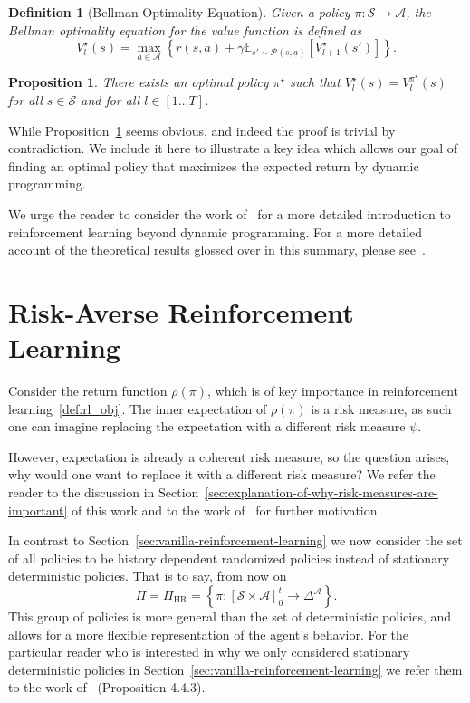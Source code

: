 \documentclass[10pt]{article}
\newtheorem{definition}{Definition}
\renewcommand{\cite}{\citep}
\theoremstyle{plain}
\newtheorem{proposition}{Proposition}
\theoremstyle{remark}
\begin{document}
\begin{definition}[Bellman Optimality Equation]\label{def:bellman_optimality}
        Given a policy $\pi : \mathcal{S} \to \mathcal{A}$, the Bellman optimality equation for the value function is defined as
        \[
                V^\star_l(s) = \max_{a \in \mathcal{A}} \left\{ r(s, a) + \gamma \mathbb{E}_{s' \sim \mathcal{P}(s, a)} [V^\star_{l+1}(s')] \right\}.
        \]
\end{definition}

\begin{proposition}\label{prop:optimal_policy_value}
        There exists an optimal policy $\pi^\star$ such that $V^\star_l(s) = V^{\pi^\star}_l(s)$ for all $s \in \mathcal{S}$ and for all $l \in [1\ldots T]$.
\end{proposition}

While Proposition~\ref{prop:optimal_policy_value} seems obvious, and indeed the proof is trivial by contradiction. We include it here to illustrate a key idea which allows our goal of finding an optimal policy that maximizes the expected return by dynamic programming.

We urge the reader to consider the work of~\cite{sutton2018} for a more detailed introduction to reinforcement learning beyond dynamic programming.
For a more detailed account of the theoretical results glossed over in this summary, please see~\cite{Puterman1994}.

\section{Risk-Averse Reinforcement Learning}

Consider the return function $\rho(\pi)$, which is of key importance in reinforcement learning~\ref{def:rl_obj}. 
The inner expectation of $\rho(\pi)$ is a risk measure, as such one can imagine replacing the expectation
with a different risk measure $\psi$.

However, expectation is already a coherent risk measure, so the question arises, why would one want to replace it with a different risk measure? 
We refer the reader to the discussion in Section~\ref{sec:explanation-of-why-risk-measures-are-important} of this
work and to the work of~\cite{Bauerle2011, follmer2016, howard1972} for further motivation. 

In contrast to Section~\ref{sec:vanilla-reinforcement-learning} we now consider the set of all policies to be history dependent randomized policies instead of stationary deterministic policies. That is to say, from now on 
\[ 
        \Pi = \Pi_{\text{HR}} = \left\{ \pi : {[\mathcal{S} \times \mathcal{A}]}_{0}^{t} \to \Delta^\mathcal{A} \right\}.
\]
This group of policies is more general than the set of deterministic policies, and allows for a more flexible representation of the agent's behavior.
For the particular reader who is interested in why we only considered stationary deterministic policies in Section~\ref{sec:vanilla-reinforcement-learning} we refer them to the work of~\cite{Puterman1994} (Proposition 4.4.3).
\end{document}
